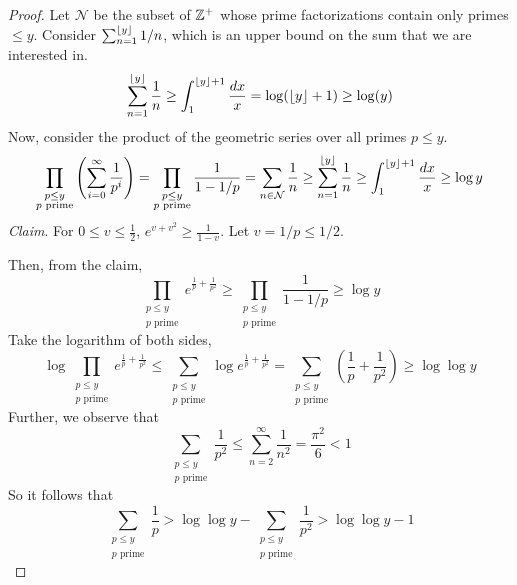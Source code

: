 \begin{proof}
    Let $\mathcal{N}$ be the subset of $\mathbb{Z}^+$ whose prime factorizations contain only primes $\leq y$. Consider $\sum_{n=1}^{\lfloor y\rfloor} 1/n$, which is an upper bound on the sum that we are interested in.
    \begin{equation}
    \sum_{n=1}^{\lfloor y\rfloor} \frac{1}{n} \geq \int_{1}^{\lfloor y\rfloor + 1} \frac{dx}{x} = \log (\lfloor y\rfloor+1) \geq \log (y)
    \end{equation}
    Now, consider the product of the geometric series over all primes $p \leq y$.
    \begin{equation}
        \prod_{\substack{p \leq y \\ \text{$p$ prime}}} \left( \sum_{i=0}^\infty \frac{1}{p^i} \right) = \prod_{\substack{p \leq y \\ \text{$p$ prime}}} \frac{1}{1 - 1/p} = \sum_{n \in \mathcal{N}} \frac{1}{n} \geq \sum_{n=1}^{\lfloor y\rfloor} \frac{1}{n} \geq \int_{1}^{\lfloor y\rfloor + 1} \frac{dx}{x} \geq \log y
    \end{equation}
    \textit{Claim}. For $0 \leq v \leq \frac{1}{2}$, $e^{v+v^2} \geq \frac{1}{1-v}$. Let $v = 1/p \leq 1/2$.

    Then, from the claim,
    \begin{equation}
    \prod_{\substack{p \leq y \\ \text{$p$ prime}}} e^{\frac{1}{p} + \frac{1}{p^2}} \geq \prod_{\substack{p \leq y \\ \text{$p$ prime}}} \frac{1}{1-1/p} \geq \log y
    \end{equation}
    Take the logarithm of both sides,
    \begin{equation}
        \log \prod_{\substack{p \leq y \\ \text{$p$ prime}}} e^{\frac{1}{p} + \frac{1}{p^2}} \leq \sum_{\substack{p \leq y \\ \text{$p$ prime}}} \log e^{\frac{1}{p} + \frac{1}{p^2}} = \sum_{\substack{p \leq y \\ \text{$p$ prime}}} \left( \frac{1}{p} + \frac{1}{p^2} \right) \geq \log \log y 
    \end{equation}
    Further, we observe that
    \begin{equation}
        \sum_{\substack{p \leq y \\ \text{$p$ prime}}} \frac{1}{p^2} \leq \sum_{n=2}^{\infty} \frac{1}{n^2} = \frac{\pi^2}{6} < 1
    \end{equation}
    So it follows that
    \begin{equation}
        \sum_{\substack{p \leq y \\ \text{$p$ prime}}} \frac{1}{p} > \log \log y - \sum_{\substack{p \leq y \\ \text{$p$ prime}}} \frac{1}{p^2} > \log \log y - 1
    \end{equation}
\end{proof}

